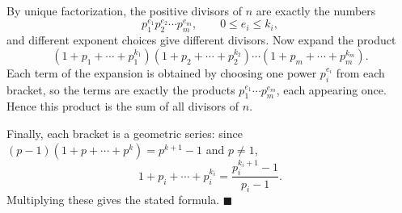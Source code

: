 By unique factorization, the positive divisors of $n$ are exactly the numbers
\[p_1^{e_1}p_2^{e_2}\cdots p_m^{e_m},\qquad 0\le e_i\le k_i,\]
and different exponent choices give different divisors. Now expand the product
\[\left(1+p_1+\cdots+p_1^{k_1}\right)\left(1+p_2+\cdots+p_2^{k_2}\right)\cdots\left(1+p_m+\cdots+p_m^{k_m}\right).\]
Each term of the expansion is obtained by choosing one power $p_i^{e_i}$ from each bracket, so the terms are exactly the products $p_1^{e_1}\cdots p_m^{e_m}$, each appearing once. Hence this product is the sum of all divisors of $n$.

Finally, each bracket is a geometric series: since $(p-1)(1+p+\cdots+p^k)=p^{k+1}-1$ and $p\ne1$,
\[1+p_i+\cdots+p_i^{k_i}=\dfrac{p_i^{k_i+1}-1}{p_i-1}.\]
Multiplying these gives the stated formula. $\blacksquare$
